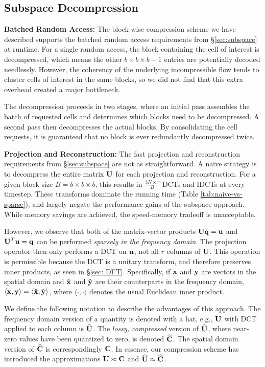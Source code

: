 \subsection{Subspace Decompression}
\label{sec:decompress}

\noindent \textbf{Batched Random Access:} The block-wise compression scheme we have described supports the batched random access requirements from \S\ref{sec:subspace} at runtime. For a single random access, the block containing the cell of interest is decompressed, which means the other $b \times b \times b - 1$ entries are potentially decoded needlessly. However, the coherency of the underlying incompressible flow tends to cluster cells of interest in the same blocks, so we did not find that this extra overhead created a major bottleneck.

The decompression proceeds in two stages, where an initial pass assembles the batch of requested cells and determines which blocks need to be decompressed. A second pass then decompresses the actual blocks. By consolidating the cell requests, it is guaranteed that no block is ever redundantly decompressed twice.

\noindent \textbf{Projection and Reconstruction:} The fast projection and reconstruction requirements from \S\ref{sec:subspace} are not as straightforward. A na\"{i}ve strategy is to decompress the entire matrix $\mathbf{U}$ for each projection and reconstruction. For a given block size $B = b \times b \times b$, this results in $\frac{3N \times r}{B}$ DCTs and IDCTs at every timestep. These transforms dominate the running time (Table \ref{tab:naive-vs-sparse}), and largely negate the performance gains of the subspace approach. While memory savings are achieved, the speed-memory tradeoff is unacceptable.

However, we observe that both of the matrix-vector products $\mathbf{U}\mathbf{q} = \mathbf{u}$ and $\mathbf{U}^T\mathbf{u} = \mathbf{q}$ can be performed {\em sparsely in the frequency domain}. The projection operator then only performs a DCT on $\mathbf{u}$, not all $r$ columns of $\mathbf{U}$. This operation is permissible because the DCT is a unitary transform, and therefore preserves inner products, as seen in \S\ref{sec: DFT}. Specifically, if $\mathbf{x}$ and $\mathbf{y}$ are vectors in the spatial domain and $\hat{\mathbf{x}}$ and $\hat{\mathbf{y}}$ are their counterparts in the frequency domain, $\langle \mathbf{x}, \mathbf{y} \rangle = \langle \hat{\mathbf{x}}, \hat{\mathbf{y}} \rangle$, where $\langle \cdot, \cdot \rangle$ denotes the usual Euclidean inner product.

We define the following notation to describe the advantages of this approach. The frequency domain version of a quantity is denoted with a hat, e.g., $\mathbf{U}$ with DCT applied to each column is $\widehat{\mathbf{U}}$. The {\em lossy, compressed} version of $\widehat{\mathbf{U}}$, where near-zero values have been quantized to zero, is denoted $\widehat{\mathbf{C}}$. The spatial domain version of $\widehat{\mathbf{C}}$ is correspondingly $\mathbf{C}$. In essence, our compression scheme has introduced the approximations $\mathbf{U} \approx \mathbf{C}$ and $\widehat{\mathbf{U}} \approx \widehat{\mathbf{C}}$.

